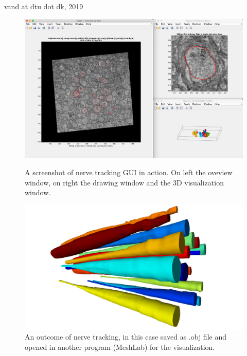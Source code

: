 \documentclass[paper=a4, fontsize=10pt]{article}
\begin{document}
\noindent vand at dtu dot dk, 2019

\newpage
	
	\begin{figure}
		\centering
		\includegraphics[width=0.9\linewidth]{images/GUI_Screenshot}
		\caption{A screenshot of nerve tracking GUI in action. On left the oveview window, on right the drawing window and the 3D visualization window.}
		\label{fig:guiscreenshot}
		\vspace{3\baselineskip}
		\includegraphics[width=\linewidth]{images/EM_mouse_meshes_screenshot}
		\caption{An outcome of nerve tracking, in this case saved as .obj file and opened in another program (MeshLab) for the visualization.}
		\label{fig:mousenerves}
	\end{figure}
\end{document}
